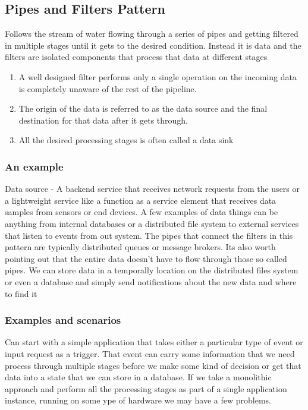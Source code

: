 \subsection{Pipes and Filters Pattern}
Follows the stream of water flowing through a series of pipes and getting filtered in multiple stages until it gets to the desired condition.
Instead it is data and the filters are isolated components that process that data at different stages

\begin{enumerate}
    \item  A well designed filter performs only a single operation on the incoming data is completely unaware of the rest of the pipeline.
    \item  The origin of the data is referred to as the data source and the final destination for that data after it gets through.
    \item  All the desired processing stages is often called a data sink
\end{enumerate}

\subsubsection{An example}
Data source - A backend service that receives network requests from the users or a lightweight service like a function as a service element that receives data samples from sensors or end devices.
A few examples of data things can be anything from internal databases or a distributed file system to external services that listen to events from out system.
The pipes that connect the filters in this pattern are typically distributed queues or message brokers.
Its also worth pointing out that the entire data doesn't have to flow through those so called pipes.
We can store data in a temporally location on the distributed files system or even a database and simply send notifications about the new data and where to find it

\subsubsection{Examples and scenarios}
Can start with a simple application that takes either a particular type of event or input request as a trigger.
That event can carry some information that we need process through multiple stages before we make some kind of decision or get that data into a state that we can store in a database.
If we take a monolithic approach and perform all the processing stages as part of a single application instance, running on some ype of hardware we may have a few problems.

